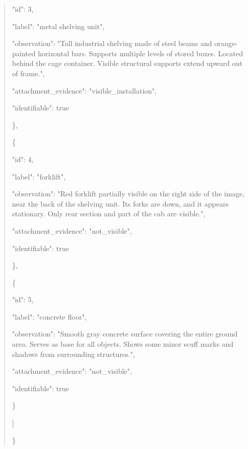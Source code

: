 \documentclass[10pt,a4paper]{article}
\begin{document}
\begin{quote}
      "id":\allowbreak{} 3,\allowbreak{}\par
      "label":\allowbreak{} "metal shelving unit",\allowbreak{}\par
      "observation":\allowbreak{} "Tall industrial shelving made of steel beams and orange-painted horizontal bars. Supports multiple levels of stored boxes. Located behind the cage container. Visible structural supports extend upward out of frame.",\allowbreak{}\par
      "attachment\_evidence":\allowbreak{} "visible\_installation",\allowbreak{}\par
      "identifiable":\allowbreak{} true\par
    \},\allowbreak{}\par
    \{\par
      "id":\allowbreak{} 4,\allowbreak{}\par
      "label":\allowbreak{} "forklift",\allowbreak{}\par
      "observation":\allowbreak{} "Red forklift partially visible on the right side of the image,\allowbreak{} near the back of the shelving unit. Its forks are down,\allowbreak{} and it appears stationary. Only rear section and part of the cab are visible.",\allowbreak{}\par
      "attachment\_evidence":\allowbreak{} "not\_visible",\allowbreak{}\par
      "identifiable":\allowbreak{} true\par
    \},\allowbreak{}\par
    \{\par
      "id":\allowbreak{} 5,\allowbreak{}\par
      "label":\allowbreak{} "concrete floor",\allowbreak{}\par
      "observation":\allowbreak{} "Smooth gray concrete surface covering the entire ground area. Serves as base for all objects. Shows some minor scuff marks and shadows from surrounding structures.",\allowbreak{}\par
      "attachment\_evidence":\allowbreak{} "not\_visible",\allowbreak{}\par
      "identifiable":\allowbreak{} true\par
    \}\par
  ]\par
\}
\end{quote}
\end{document}
